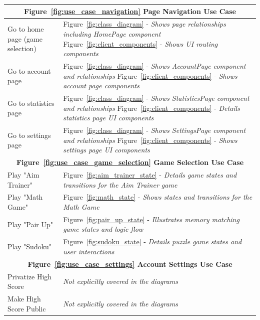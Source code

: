 \documentclass[11pt,a4paper]{article}
\begin{document}
\begin{table}
\begin{tabular}{|p{}|p{}|}
\hline
\multicolumn{2}{|c|}{\textbf {Figure~\ref{fig:use_case_navigation} Page Navigation Use Case} }                          \\
\hline
Go to home page (game selection)& Figure~\ref{fig:class_diagram} - \textit{Shows page relationships including HomePage component}\newline
Figure~\ref{fig:client_components} - \textit{Shows UI routing components}\\
\hline
Go to account page& Figure~\ref{fig:class_diagram} - \textit{Shows AccountPage component and relationships}\newline
Figure~\ref{fig:client_components} - \textit{Shows account page components}\\
\hline
Go to statistics page& Figure~\ref{fig:class_diagram} - \textit{Shows StatisticsPage component and relationships}\newline
Figure~\ref{fig:client_components} - \textit{Details statistics page UI components}\\
\hline
Go to settings page& Figure~\ref{fig:class_diagram} - \textit{Shows SettingsPage component and relationships}\newline
Figure~\ref{fig:client_components} - \textit{Shows settings page UI components}\\
\hline
\multicolumn{2}{|c|}{\textbf {Figure~\ref{fig:use_case_game_selection} Game Selection Use Case} }           \\
\hline
Play "Aim Trainer"& Figure~\ref{fig:aim_trainer_state} - \textit{Details game states and transitions for the Aim Trainer game}\\
\hline
Play "Math Game"& Figure~\ref{fig:math_state} - \textit{Shows states and transitions for the Math Game}\\
\hline
Play "Pair Up"& Figure~\ref{fig:pair_up_state} - \textit{Illustrates memory matching game states and logic flow}\\
\hline
Play "Sudoku"& Figure~\ref{fig:sudoku_state} - \textit{Details puzzle game states and user interactions}\\
\hline
\multicolumn{2}{|c|}{\textbf {Figure~\ref{fig:use_case_settings} Account Settings Use Case} }   \\
\hline
Privatize High Score& \textit{Not explicitly covered in the diagrams}\\
\hline
Make High Score Public& \textit{Not explicitly covered in the diagrams}\\
\hline
\end{tabular}


\end{table}
\end{document}
